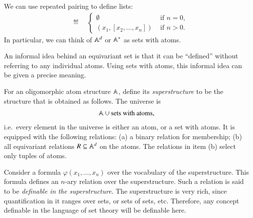 \begin{myexample}
	[Lists]\label{ex:lists} We can use repeated pairing to define lists: 
	\begin{align*}
		[x_1,\ldots,x_n] 
		\quad \eqdef \quad
		\begin{cases}
			\emptyset & \text{ if } n = 0, \\
			(x_1,[x_2,\ldots,x_n]) & \text{ if } n > 0.
		\end{cases}
	\end{align*}
	 In particular, we can think of $\mathbb A^d$ or $\mathbb A^*$ as  sets with atoms. 
\end{myexample}


An informal idea behind an equivariant set is that it can be ``defined'' without referring to any individual atoms. Using sets with atoms, this informal idea can be given a precise meaning.

\begin{definition}
	[Superstructure]
		For an oligomorphic atom structure $\mathbb A$, define its \emph{superstructure}  to be the structure that is obtained as follows. The universe is 
	\begin{align*}
		\mathbb A \cup \text{sets with atoms},
	\end{align*}
	i.e.~every element in the universe is either an atom, or a set with atoms. It is equipped with the following relations: (a)  a  binary relation for membership; (b)  all equivariant relations $R \subseteq \mathbb A^d$ on the atoms.  The relations in item (b) select only tuples of atoms. 
\end{definition}


	Consider a formula $\varphi(x_1,\ldots,x_n)$ over the vocabulary of the superstructure. This formula defines an $n$-ary relation over the superstructure. Such a relation is said to be \emph{definable in the superstructure}. The superstructure is very rich, since quantification in it ranges over sets, or sets of sets, etc. Therefore, any concept definable in the language of set theory will be definable here. 
	
